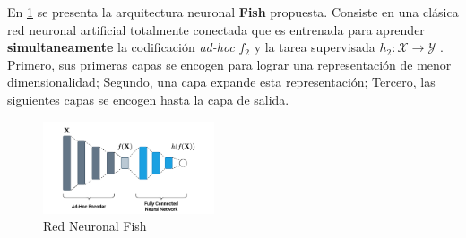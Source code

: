 En \ref{fig:fish} se presenta la arquitectura neuronal \textbf{Fish} propuesta. Consiste en una clásica red neuronal artificial totalmente conectada que es entrenada para aprender \textbf{simultaneamente} la codificación \textit{ad-hoc} $f_2$ y la tarea supervisada $h_2\colon \mathcal{X} \rightarrow \mathcal{Y}$ . Primero, sus primeras capas se encogen para lograr una representación de menor dimensionalidad; Segundo, una capa expande esta representación; Tercero, las siguientes capas se encogen hasta la capa de salida.

\begin{figure}[h]
\centering
\includegraphics[width=0.45\textwidth]{fish}
\caption{\label{fig:fish} Red Neuronal Fish}
\end{figure}